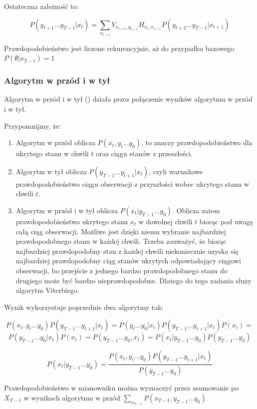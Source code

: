 Ostateczna zależność to:

$$P(y_{t+1} \dots y_{T-1} | x_t) =  \sum_{x_{t+1}} V_{x_{t+1},y_{t+1}} H_{x_t,x_{t+1}} P(y_{t+2} \dots y_{T-1} | x_{t+1})$$

Prawdopodobieństwo jest liczone rekurencyjnie, aż do przypadku bazowego $P(\emptyset | x_{T-1}) = 1$

\subsubsection{Algorytm w przód i w tył}
Algorytm w przód i w tył () działa przez połączenie wyników algorytmu w przód i w tył.

Przypomnijmy, że:

\begin{enumerate}
    \item Algorytm w przód oblicza $P(x_t, y_t \dots y_0)$, to znaczy prawdopodobieństwo dla ukrytego stanu w chwili $t$ oraz ciągu stanów z przeszłości.
    \item Algorytm w tył oblicza $P(y_{T-1} \dots y_{t+1} | x_t)$, czyli warunkowe prawdopodobieństwo ciągu obserwacji z przyszłości wobec ukrytego stanu w chwili $t$.
    \item Algorytm w przód i w tył oblicza $P(x_t | y_{T-1} \dots y_0)$. Oblicza zatem prawdopodobieństwo ukrytego stanu $x_t$ w dowolnej chwili $t$ biorąc pod uwagę całą ciąg obserwacji. Możliwe jest dzięki niemu wybranie najbardziej prawdopodobnego stanu w każdej chwili. Trzeba zauważyć, że biorąc najbardziej prawdopodobny stan z każdej chwili niekoniecznie uzyska się najbardziej prawdopodobny ciąg stanów ukrytych odpowiadający ciągowi obserwacji, bo przejście z jednego bardzo prawdopodobnego stanu do drugiego może być bardzo nieprawdopodobne. Dlatego do tego zadania służy algorytm Viterbiego.
\end{enumerate}

Wynik  wykorzystuje poprzednie dwa algorytmy tak:

$$P(x_t, y_t \dots y_0) P(y_{T-1} \dots y_{t+1} | x_t) = P(y_t \dots y_0 | x_t) P(y_{T-1} \dots y_{t+1} | x_t) P(x_t) = $$
$$P(y_{T-1} \dots y_0 | x_t) P(x_t) = P(y_{T-1} \dots y_0, x_t) = P(x_t | y_{T-1} \dots y_0) P(y_{T-1} \dots y_0)$$

$$P(x_t | y_{T-1} \dots y_0) = \frac{P(x_t, y_t \dots y_0) P(y_{T-1} \dots y_{t+1} | x_t)}{P(y_{T-1} \dots y_0)}$$

Prawdopodobieństwo w mianowniku można wyznaczyć przez zsumowanie po $X_{T-1}$ w wynikach algorytmu w przód $\sum_{x_{T-1}} P(x_{T-1}, y_{T-1} \dots y_0)$

